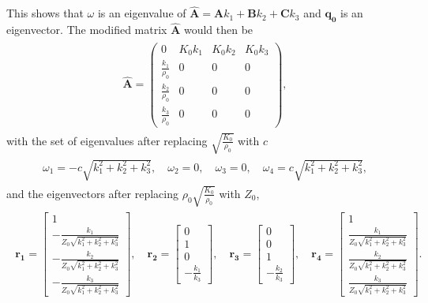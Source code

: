 This shows that $\omega$ is an eigenvalue of $\mathbf{\hat{A}} = \mathbf{A}k_1 + \mathbf{B}k_2 + \mathbf{C}k_3$ and $\mathbf{q_0}$ is an eigenvector. The modified matrix $\mathbf{\hat{A}}$ would then be
\begin{align}
    \begin{split}
    \mathbf{\hat{A}} = \left(\begin{array}{rrrr}
0 & K_{0} k_{1} & K_{0} k_{2} & K_{0} k_{3} \\
\frac{k_{1}}{\rho_{0}} & 0 & 0 & 0 \\
\frac{k_{2}}{\rho_{0}} & 0 & 0 & 0 \\
\frac{k_{3}}{\rho_{0}} & 0 & 0 & 0
\end{array}\right) ,
    \end{split}
\end{align}
with the set of eigenvalues after replacing $\sqrt{\frac{K_{0}}{\rho_{0}}}$ with $c$
\begin{align}
    \begin{split}
        \omega_1 = -c \sqrt{k_{1}^{2} + k_{2}^{2} + k_{3}^{2}}, \quad
        \omega_2 = 0, \quad
        \omega_3 = 0, \quad 
        \omega_4 = c \sqrt{k_{1}^{2} + k_{2}^{2} + k_{3}^{2}},
    \end{split}
\end{align}
and the eigenvectors after replacing $\rho_0 \sqrt{\frac{K_0}{\rho_0}}$ with $Z_0$,
\begin{align}
    \begin{split}
    \mathbf{r_1} = \begin{bmatrix}
        1 \\
-\frac{k_{1}}{Z_0 \sqrt{k_{1}^{2} + k_{2}^{2} + k_{3}^{2}}} \\
-\frac{k_{2}}{Z_0 \sqrt{k_{1}^{2} + k_{2}^{2} + k_{3}^{2}}} \\
-\frac{k_{3}}{Z_0 \sqrt{k_{1}^{2} + k_{2}^{2} + k_{3}^{2}}}
        \end{bmatrix}, \quad
        \mathbf{r_2} = \begin{bmatrix}
            0 \\
1 \\
0 \\
-\frac{k_{1}}{k_{3}}
            \end{bmatrix}, \quad
            \mathbf{r_3} = \begin{bmatrix}
                0 \\
                0 \\
                1 \\
                -\frac{k_{2}}{k_{3}}
                \end{bmatrix}, \quad
                \mathbf{r_4} = \begin{bmatrix}
                    1 \\
\frac{k_{1}}{Z_0 \sqrt{k_{1}^{2} + k_{2}^{2} + k_{3}^{2}}} \\
\frac{k_{2}}{Z_0 \sqrt{k_{1}^{2} + k_{2}^{2} + k_{3}^{2}}} \\
\frac{k_{3}}{Z_0 \sqrt{k_{1}^{2} + k_{2}^{2} + k_{3}^{2}}}
                    \end{bmatrix} .
    \end{split}
\end{align}

